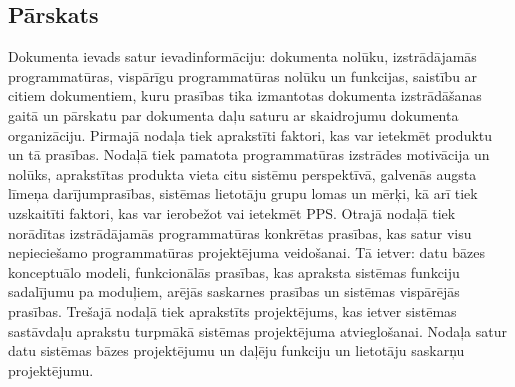 \subsection*{Pārskats}

Dokumenta ievads satur ievadinformāciju: dokumenta nolūku, izstrādājamās programmatūras, vispārīgu programmatūras nolūku un funkcijas, saistību ar citiem dokumentiem, kuru prasības tika izmantotas dokumenta izstrādāšanas gaitā un pārskatu par dokumenta daļu saturu ar skaidrojumu dokumenta organizāciju.
Pirmajā nodaļa tiek aprakstīti faktori, kas var ietekmēt produktu un tā prasības.
Nodaļā tiek pamatota programmatūras izstrādes motivācija un nolūks, aprakstītas produkta vieta citu sistēmu perspektīvā, galvenās augsta līmeņa darījumprasības, sistēmas lietotāju grupu lomas un mērķi, kā arī tiek uzskaitīti faktori, kas var ierobežot vai ietekmēt PPS.
Otrajā nodaļā tiek norādītas izstrādājamās programmatūras konkrētas prasības, kas satur visu nepieciešamo programmatūras projektējuma veidošanai.
Tā ietver: datu bāzes konceptuālo modeli, funkcionālās prasības, kas apraksta sistēmas funkciju sadalījumu pa moduļiem, arējās saskarnes prasības un sistēmas vispārējās prasības.
Trešajā nodaļā tiek aprakstīts projektējums, kas ietver sistēmas sastāvdaļu aprakstu turpmākā sistēmas projektējuma atvieglošanai.
Nodaļa satur datu sistēmas bāzes projektējumu un daļēju funkciju un lietotāju saskarņu projektējumu.
